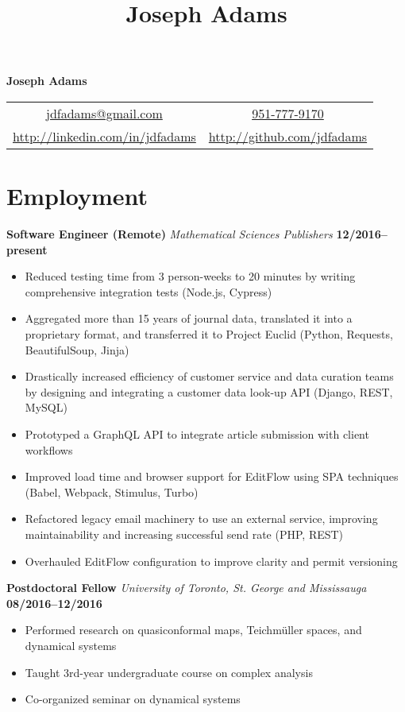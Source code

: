 \documentclass[11pt]{article}
\title{Joseph Adams}
\makeatletter
\newcommand\email{jdfadams@gmail.com}
\newcommand\phone{951-777-9170}
\makeatother
\begin{document}

\begin{center}
  \textbf{\Large Joseph Adams} \\[1.5\baselineskip]
  \begin{tabular}{c c}
    \href{mailto:\email}{\email} & \href{tel:1-\phone}{\phone} \\
    \url{http://linkedin.com/in/jdfadams} & \url{http://github.com/jdfadams}
  \end{tabular}
\end{center}

\section*{Employment}
\noindent\textbf{Software Engineer (Remote)} \emph{Mathematical Sciences Publishers} \hfill \textbf{12/2016--present}
\begin{itemize}
  \item Reduced testing time from 3 person-weeks to 20 minutes by writing comprehensive integration tests (Node.js, Cypress)
  \item Aggregated more than 15 years of journal data, translated it into a proprietary format, and transferred it to Project Euclid (Python, Requests, BeautifulSoup, Jinja)
  \item Drastically increased efficiency of customer service and data curation teams by designing and integrating a customer data look-up API (Django, REST, MySQL) 
  \item Prototyped a GraphQL API to integrate article submission with client workflows
  \item Improved load time and browser support for EditFlow using SPA techniques (Babel, Webpack, Stimulus, Turbo)
  \item Refactored legacy email machinery to use an external service, improving maintainability and increasing successful send rate (PHP, REST)
  \item Overhauled EditFlow configuration to improve clarity and permit versioning
\end{itemize}
\vspace{0.5cm}
\noindent\textbf{Postdoctoral Fellow} \emph{University of Toronto, St. George and Mississauga} \hfill \textbf{08/2016--12/2016}
\begin{itemize}
  \itemsep 0em
  \item Performed research on quasiconformal maps, Teichm\"{u}ller spaces, and dynamical systems
  \item Taught 3rd-year undergraduate course on complex analysis
  \item Co-organized seminar on dynamical systems
\end{itemize}
\end{document}
